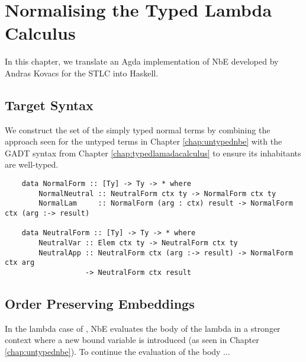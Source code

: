 \chapter{Normalising the Typed Lambda Calculus}
\label{chap:typednbe}

In this chapter, we translate an Agda implementation of NbE developed by Andras Kovacs \cite{AgdaNbe} for the STLC into Haskell.

\section{Target Syntax}


We construct the set of the simply typed normal terms  by combining the approach seen for the untyped terms in Chapter \ref{chap:untypednbe} with the GADT syntax from Chapter \ref{chap:typedlamadacalculus} to ensure its inhabitants are well-typed.

\begin{lstlisting}
    data NormalForm :: [Ty] -> Ty -> * where
        NormalNeutral :: NeutralForm ctx ty -> NormalForm ctx ty
        NormalLam     :: NormalForm (arg : ctx) result -> NormalForm ctx (arg :-> result)    

    data NeutralForm :: [Ty] -> Ty -> * where
        NeutralVar :: Elem ctx ty -> NeutralForm ctx ty
        NeutralApp :: NeutralForm ctx (arg :-> result) -> NormalForm ctx arg 
                   -> NeutralForm ctx result

\end{lstlisting}






\section{Order Preserving Embeddings}

In the lambda case of , NbE evaluates the body of the lambda in a stronger context where a new bound variable is introduced (as seen in Chapter \ref{chap:untypednbe}). To continue the evaluation of the body ...

